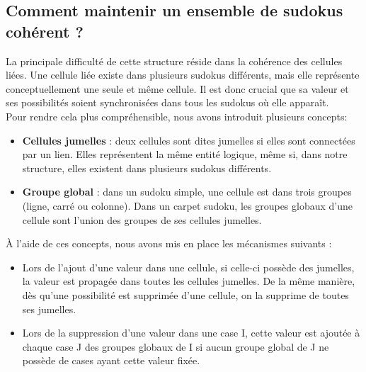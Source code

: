 \documentclass[a4paper]{article}
\begin{document}
\subsection{Comment maintenir un ensemble de sudokus cohérent ?}
\begin{justify}
    \qquad La principale difficulté de cette structure réside dans la cohérence des cellules liées. Une cellule liée existe dans plusieurs sudokus différents, mais elle représente conceptuellement une seule et même cellule. Il est donc crucial que sa valeur et ses possibilités soient synchronisées dans tous les sudokus où elle apparaît. \\
    
    \noindent Pour rendre cela plus compréhensible, nous avons introduit plusieurs concepts:
    \begin{itemize}
    \item \textbf{Cellules jumelles} : deux cellules sont dites jumelles si elles sont connectées par un lien. Elles représentent la même entité logique, même si, dans notre structure, elles existent dans plusieurs sudokus différents.
    \item \textbf{Groupe global} : dans un sudoku simple, une cellule est dans trois groupes (ligne, carré ou colonne). Dans un carpet sudoku, les groupes globaux d'une cellule sont l'union des groupes de ses cellules jumelles. 
    \end{itemize}
    
    \noindent À l'aide de ces concepts, nous avons mis en place les mécanismes suivants :
    \begin{itemize}
        \item Lors de l’ajout d’une valeur dans une cellule, si celle-ci possède des jumelles, la valeur est propagée dans toutes les cellules jumelles. De la même manière, dès qu'une possibilité est supprimée d'une cellule, on la supprime de toutes ses jumelles.

        \item Lors de la suppression d'une valeur dans une case I, cette valeur est ajoutée à chaque case J des groupes globaux de I si aucun groupe global de J ne possède de cases ayant cette valeur fixée.
    \end{itemize}
\end{justify}
\newpage
\end{document}
